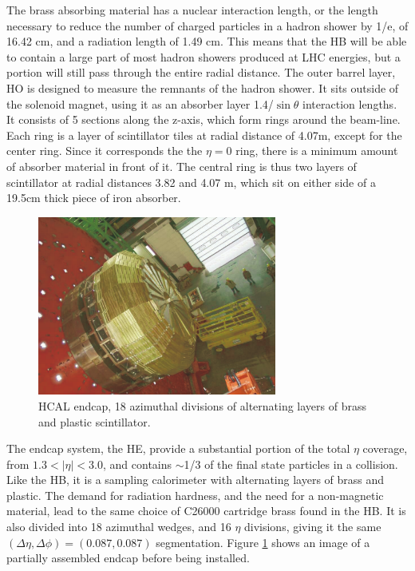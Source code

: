 \par  The brass absorbing material has a nuclear interaction length,
or the length necessary to reduce the number of charged particles in a
hadron shower by 1/e, of 16.42 cm, and a radiation length of 1.49 cm.
This means that the HB will be able to contain a large part of most
hadron showers produced at LHC energies, but a portion will still pass
through the entire radial distance.  The outer barrel layer, HO is
designed to measure the remnants of the hadron shower.  It sits outside
of the solenoid magnet, using it as an absorber layer
1.4/$\sin{\theta}$ interaction lengths.  It consists of 5 sections
along the z-axis, which form rings around the beam-line.  Each ring is
a layer of scintillator tiles at radial distance of 4.07m, except for
the center ring.  Since it corresponds the the $\eta=0$ ring, there is
a minimum amount of absorber material in front of it.  The central
ring is thus two layers of scintillator at radial distances 3.82 and
4.07 m, which sit on either side of a 19.5cm thick piece of iron
absorber.  

\begin{figure}[h]
   \centering
  \includegraphics[width=0.7\textwidth]{Figures/CMS_Diagrams/HCAL__Endcap.pdf}
  \caption{HCAL endcap, 18 azimuthal divisions of alternating layers
    of brass and plastic scintillator.} \label{fig:hcal_endcap}
\end{figure}

\par The endcap system, the HE, provide a substantial portion of the total
$\eta$ coverage, from $1.3<|\eta|<3.0$, and contains $\sim$1/3 of the
final state particles in a collision.  Like the HB, it is a sampling
calorimeter with alternating layers of brass and plastic.  The demand
for radiation hardness, and the need for a non-magnetic material, lead
to the same choice of C26000 cartridge brass found in the HB.  It is
also divided into 18 azimuthal wedges, and 16 $\eta$ divisions, giving
it the same $(\Delta\eta, \Delta\phi) = (0.087, 0.087)$ segmentation.
Figure \ref{fig:hcal_endcap} shows an image of a partially assembled
endcap before being installed.

